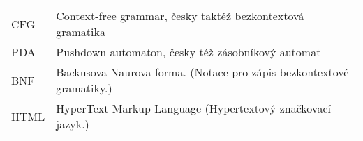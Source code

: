 
\seznamzkr

\begin{tabular}{ll}
	CFG & Context-free grammar, česky taktéž bezkontextová gramatika \\
	PDA & Pushdown automaton, česky též zásobníkový automat \\
	BNF & Backusova-Naurova forma. (Notace pro zápis bezkontextové gramatiky.) \\
	HTML & HyperText Markup Language (Hypertextový značkovací jazyk.) \\
\end{tabular}


